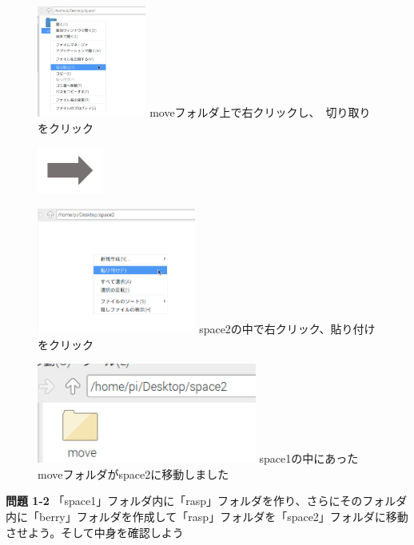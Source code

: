 \documentclass[a4paper,12pt]{jarticle}
\begin{document}
\begin{figure}[ht]
\centering
\begin{minipage}{6.589cm}
\includegraphics[width=3.584cm,height=3.658cm]{textbook-img048.png}
	{
moveフォルダ上で右クリックし、　切り取りをクリック
	}
\end{minipage}
\includegraphics[width=2.168cm,height=1.542cm]{textbook-img049.png}
\begin{minipage}{6.589cm}
\includegraphics[width=5.225cm,height=4.119cm]{textbook-img046.png}
	{
space2の中で右クリック、貼り付けをクリック
	}
\end{minipage}

\begin{minipage}{6.589cm}
\includegraphics[width=7.218cm,height=3.281cm]{textbook-img045.png}
	{
space1の中にあったmoveフォルダがspace2に移動しました
	}
\end{minipage}


\end{figure}


{\bfseries 問題 1-2}
「space1」フォルダ内に「rasp」フォルダを作り、さらにそのフォルダ内に「berry」フォルダを作成して「rasp」フォルダを「space2」フォルダに移動させよう。そして中身を確認しよう
\end{document}
